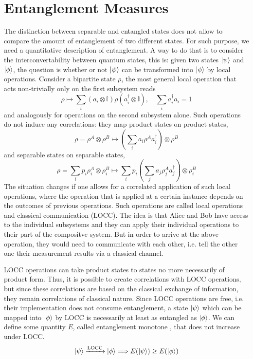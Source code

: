 \documentclass[10pt,a4paper]{book}
\numberwithin{equation}{chapter}
\numberwithin{figure}{chapter}
\numberwithin{table}{chapter}
\begin{document}
\section{Entanglement Measures}
The distinction between separable and entangled states does not allow to compare the amount of entanglement of two different states. For such purpose, we need a quantitative description of entanglement. A way to do that is to consider the interconvertability between quantum states, this is: given two states $\ket{\psi}$ and $\ket{\phi}$, the question is whether or not $\ket{\psi}$ can be transformed into $\ket{\phi}$ by local operations. Consider a bipartite state $\rho$, the most general local operation that acts non-trivially only on the first subsystem reads
\begin{equation}
\rho \longmapsto \sum_{i}(a_i \otimes \mathbb{I})\rho (a^{\dagger}_i \otimes \mathbb{I}), \quad \sum_i a^{\dagger}_i a_i =1
\end{equation}
and analogously for operations on the second subsystem alone. Such operations do not induce any correlations: they map product states on product states,
\begin{equation}
\rho=\rho^A \otimes \rho^B \longmapsto \left( \sum_i a_i \rho^A a^{\dagger}_i \right) \otimes \rho^B
\end{equation}
and separable states on separable states,
\begin{equation}
\rho=\sum_ip_i \rho^{A}_i \otimes \rho^{B}_i \longmapsto \sum_i p_i \left( \sum_j a_j \rho^{A}_j  a^{\dagger}_j \right) \otimes \rho^{B}_i 
\end{equation}
The situation changes if one allows for a correlated application of such local operations, where the operation that is applied at a certain instance depends on the outcomes of previous operations. Such operations are called local operations and classical communication (LOCC). The idea is that Alice and Bob have access to the individual subsystems and they can apply their individual operations to their part of the compositve system. But in order to arrive at the above operation, they would need to communicate with each other, i.e. tell the other one their measurement results via a classical channel. 

LOCC operations can take product states to states no more necessarily of product form. Thus, it is possible to create correlations with LOCC operations, but since these correlations are based on the classical exchange of information, they remain correlations of classical nature. Since LOCC operations are free, i.e. their implementation does not consume entanglement, a state $\ket{\psi}$ which can be mapped into $\ket{\phi}$ by LOCC is necessarily at least as entangled as $\ket{\phi}$. We can define some quantity $E$, called entanglement monotone \cite{EnMon}, that does not increase under LOCC.
$$\ket{\psi} \xrightarrow{\text{LOCC}}\ket{\phi} \Longrightarrow E(\ket{\psi})\geq E(\ket{\phi})$$
\end{document}
